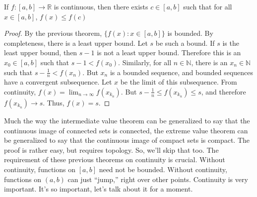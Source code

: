 \documentclass[crop=false,class=article,oneside]{standalone}
\begin{document}
            \begin{theorem}
                If $f:[a,b]\rightarrow\mathbb{R}$ is continuous,
                then there exists $c\in[a,b]$ such that
                for all $x\in[a,b]$, $f(x)\leq{f(c)}$
            \end{theorem}
            \begin{proof}
                By the previous theorem,
                $\{f(x):x\in[a,b]\}$ is bounded. By completeness,
                there is a least upper bound. Let $s$ be such
                a bound. If $s$ is the least upper bound, then
                $s-1$ is not a least upper bound. Therefore this is
                an $x_{0}\in[a,b]$ such that $s-1<f(x_{0})$. Similarly,
                for all $n\in\mathbb{N}$, there is an
                $x_{n}\in\mathbb{N}$ such that
                $s-\frac{1}{n}<f(x_{n})$. But $x_{n}$ is a bounded
                sequence, and bounded sequences have a convergent
                subsequence. Let $x$ be the limit of this
                subsequence. From continuity,
                $f(x)=\lim_{n\rightarrow\infty}f(x_{k_{n}})$.
                But $s-\frac{1}{n}\leq{f(x_{k_{n}})}\leq{s}$,
                and therefore $f(x_{k_{n}})\rightarrow{s}$.
                Thus, $f(x)=s$.
            \end{proof}
            Much the way the intermediate value theorem can be
            generalized to say that the continuous image of
            connected sets is connected, the extreme value
            theorem can be generalized to say that the
            continuous image of compact sets is compact.
            The proof is rather easy, but requires
            topology. So, we'll skip that too.
            The requirement of these previous theorems on
            continuity is crucial. Without continuity, functions
            on $[a,b]$ need not be bounded. Without continuity,
            functions on $(a,b)$ can just ``jump,'' right over
            other points. Continuity is very important. It's so
            important, let's talk about it for a moment.
\end{document}
